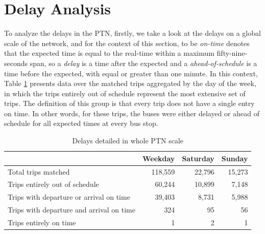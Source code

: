 \section{Delay Analysis}
To analyze the delays in the PTN, firstly, we take a look at the delays on a global scale of the network, and for the context of this section, to be {\em on-time} denotes that the expected time is equal to the real-time
within a maximum fifty-nine-seconds span, so a {\em delay} is a time after the expected and a {\em ahead-of-schedule}
is a time before the expected, with equal or greater than one minute.
In this context, Table \ref{tab:delay1} presents data over the matched trips aggregated by the day of the week, 
in which the trips entirely out of schedule represent the most extensive set of trips. The definition of this group is that every trip 
does not have a single entry on time. In other words, for these trips, the buses were either delayed
or ahead of schedule for all expected times at every bus stop. 



\begin{table}[h]
\centering
\caption{Delays detailed in whole PTN scale } 
\begin{tabular}{|l|r|r|r|}
\hline
\multicolumn{1}{|c|}{} & Weekday    & Saturday    & Sunday  \\ \hline
Total trips  matched & 118,559 &  22,796  & 15,273\\ \hline
Trips entirely out of schedule & 60,244  & 10,899 & 7,148\\ \hline
Trips with departure or arrival on time & 39,403 & 8,731 &    5,988\\ \hline
Trips with departure and arrival on time & 324 & 95 & 56 \\ \hline
Trips entirely on time & 1 & 2 &  1\\ \hline
\end{tabular}
\label{tab:delay1}
\end{table}

